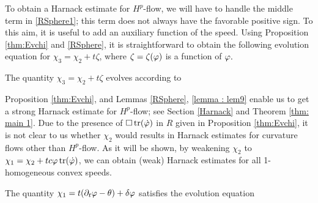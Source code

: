 \documentclass{amsart}
\begin{document}

To obtain a Harnack estimate for $H^{p}$-flow, we will have to handle the middle term in \cref{RSphere1}; this term does not always have the favorable positive sign. To this aim, it is useful to add an auxiliary function of the speed. Using Proposition \ref{thm:Evchi} and \cref{RSphere}, it is straightforward to obtain the following evolution equation for $\chi_3=\chi_2+t\zeta$, where $\zeta=\zeta(\varphi)$ is a function of $\varphi.$

\begin{lemma}\label{lemma : lem9}
The quantity
$\chi_3=\chi_2+t\zeta$
evolves according to
\end{lemma}
Proposition \ref{thm:Evchi}, and Lemmas \ref{RSphere}, \ref{lemma : lem9}  enable us to get a strong Harnack estimate for $H^{p}$-flow; see Section \ref{Harnack} and Theorem \ref{thm: main 1}. Due to the presence of $\Box\operatorname{tr}(\dot{\varphi})$ in $R$ given in Proposition \ref{thm:Evchi}, it is not clear to us whether $\chi_2$ would results in Harnack estimates for curvature flows other than $H^{p}$-flow. As it will be shown, by weakening $\chi_2$ to $\chi_1=\chi_2+tc\varphi\operatorname{tr}(\dot{\varphi})$,  we can obtain (weak) Harnack estimates for all 1-homogeneous convex speeds.

\begin{proposition}\label{WeakHarnackEv}
The quantity
$\chi_1=t(\partial_t\varphi-\theta)+\delta\varphi$
satisfies the evolution equation
\end{proposition}
\end{document}
